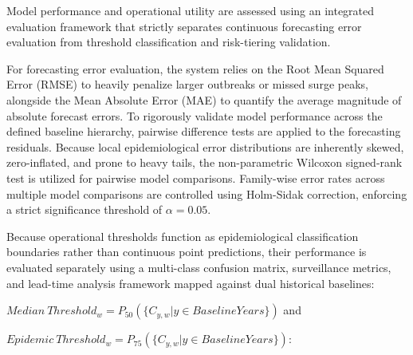 \documentclass[
]{article}
\begin{document}
Model performance and operational utility are assessed using an
integrated evaluation framework that strictly separates continuous
forecasting error evaluation from threshold classification and
risk-tiering validation.

For forecasting error evaluation, the system relies on the Root Mean
Squared Error (RMSE) to heavily penalize larger outbreaks or missed
surge peaks, alongside the Mean Absolute Error (MAE) to quantify the
average magnitude of absolute forecast errors. To rigorously validate
model performance across the defined baseline hierarchy, pairwise
difference tests are applied to the forecasting residuals. Because local
epidemiological error distributions are inherently skewed,
zero-inflated, and prone to heavy tails, the non-parametric Wilcoxon
signed-rank test is utilized for pairwise model comparisons. Family-wise
error rates across multiple model comparisons are controlled using
Holm-Sidak correction, enforcing a strict significance threshold of
\(\alpha = 0.05\).

Because operational thresholds function as epidemiological
classification boundaries rather than continuous point predictions,
their performance is evaluated separately using a multi-class confusion
matrix, surveillance metrics, and lead-time analysis framework mapped
against dual historical baselines:

\(Median\ Threshold_{w} = P_{50}(\{ C_{y,w}|y \in BaselineYears\})\) and

\(Epidemic\ Threshold_{w} = P_{75}(\{ C_{y,w}|y \in BaselineYears\})\):
\end{document}
